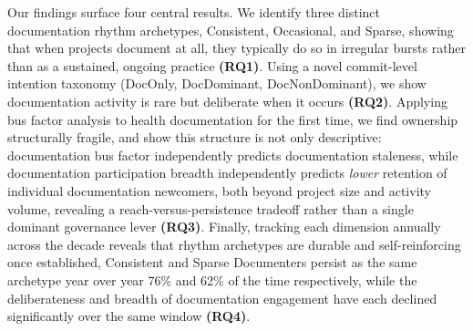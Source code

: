 \documentclass[10pt,conference]{IEEEtran}
\newcommand{\EAdejumo}[1]{\textcolor{red}{{\bfseries [[#1]]}}}
\begin{document}
Our findings surface four central results. We identify three distinct documentation rhythm archetypes, Consistent, Occasional, and Sparse, showing that when projects document at all, they typically do so in irregular bursts rather than as a sustained, ongoing practice \textbf{(RQ1)}. Using a novel commit-level intention taxonomy (DocOnly, DocDominant, DocNonDominant), we show documentation activity is rare but deliberate when it occurs \textbf{(RQ2)}. Applying bus factor analysis to health documentation for the first time, we find ownership structurally fragile, and show this structure is not only descriptive: documentation bus factor independently predicts documentation staleness, while documentation participation breadth independently predicts \textit{lower} retention of individual documentation newcomers, both beyond project size and activity volume, revealing a reach-versus-persistence tradeoff rather than a single dominant governance lever \textbf{(RQ3)}. Finally, tracking each dimension annually across the decade reveals that rhythm archetypes are durable and self-reinforcing once established, Consistent and Sparse Documenters persist as the same archetype year over year 76\% and 62\% of the time respectively, while the deliberateness and breadth of documentation engagement have each declined significantly over the same window \textbf{(RQ4)}.







\end{document}
